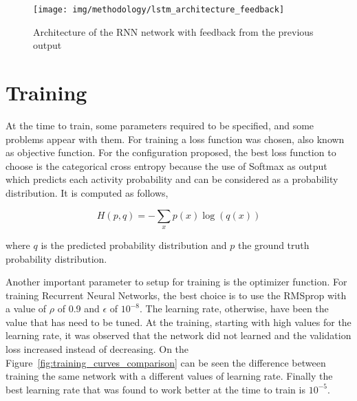 \begin{figure}[H]
\begin{center}
\texttt{[image: img/methodology/lstm\_architecture\_feedback]}
\end{center}
\caption{Architecture of the RNN network with feedback from the previous output}
\label{fig:lstm_architecture_feedback}
\end{figure}






\section{Training}

At the time to train, some parameters required to be specified, and some problems appear with them. For training a loss function was chosen, also known as objective function. For the configuration proposed, the best loss function to choose is the categorical cross entropy because the use of Softmax as output which predicts each activity probability and can be considered as a probability distribution. It is computed as follows,

\begin{equation}
	H(p,q) = - \sum_x p(x) \log(q(x))
\end{equation}

where $q$ is the predicted probability distribution and $p$ the ground truth probability distribution.

Another important parameter to setup for training is the optimizer function. For training Recurrent Neural Networks, the best choice is to use the RMSprop\cite{dauphin2015rmsprop} with a value of $\rho$ of 0.9 and $\epsilon$ of $10^{-8}$. The learning rate, otherwise, have been the value that has need to be tuned. At the training, starting with high values for the learning rate, it was observed that the network did not learned and the validation loss increased instead of decreasing. On the Figure~\ref{fig:training_curves_comparison} can be seen the difference between training the same network with a different values of learning rate. Finally the best learning rate that was found to work better at the time to train is $10^{-5}$.

